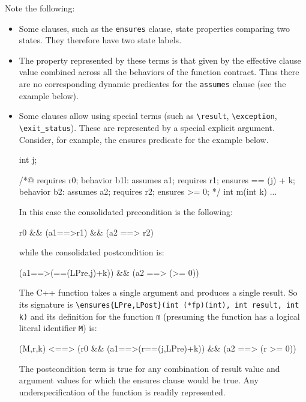 Note the following:
\begin{itemize}
	\item Some clauses, such as the \lstinline|ensures| clause,
	state properties comparing two states. They therefore have two state labels.
	\item The property represented by these terms is that
	given by the effective clause value combined across all the
	behaviors of the function contract. Thus there are no
	corresponding dynamic predicates for the \lstinline|assumes| clause (see the example below).
	\item Some clauses allow using special terms (such as
	\lstinline|\result|,
	\lstinline|\exception|, \lstinline|\exit_status|).
	These are represented by a special explicit argument. Consider, for example, the ensures predicate for the example below.

\begin{listing-nonumber}
int j;

/*@
requires r0;
behavior b1l:
  assumes a1;
  requires r1;
  ensures \result == \old(j) + k;
behavior b2:
  assumes a2;
  requires r2;
  ensures \result >= 0;
*/
int m(int k) { ... }
\end{listing-nonumber}

	In this case the consolidated precondition is the following:
	\begin{listing-nonumber}
          r0 && (a1==>r1) && (a2 ==> r2)
        \end{listing-nonumber}
	while the consolidated postcondition is:
	\begin{listing-nonumber}
          (a1==>(\result==\at(LPre,j)+k)) && (a2 ==> (\result>= 0))
        \end{listing-nonumber}
	The C++ function takes a single argument and produces a single result. So its signature is
	\lstinline|\ensures{LPre,LPost}(int (*fp)(int), int result, int k)|
	and its definition for the function \lstinline|m| (presuming the
        function has a logical literal identifier \lstinline|M|) is:
	\begin{listing-nonumber}
        (M,r,k) <==>
            (r0 && (a1==>(r==\at(j,LPre)+k)) && (a2 ==> (r >= 0))
        \end{listing-nonumber}
	The postcondition term is true for any combination of
	result value and argument values for which the ensures clause would be true. Any underspecification of the function is readily represented.

\end{itemize}

